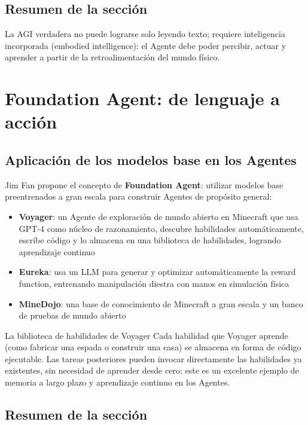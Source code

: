 \documentclass[a4paper]{article}
\begin{document}
\subsection{Resumen de la sección}

La AGI verdadera no puede lograrse solo leyendo texto; requiere inteligencia incorporada (embodied intelligence): el Agente debe poder percibir, actuar y aprender a partir de la retroalimentación del mundo físico.

\section{Foundation Agent: de lenguaje a acción}

\subsection{Aplicación de los modelos base en los Agentes}

Jim Fan propone el concepto de \textbf{Foundation Agent}: utilizar modelos base preentrenados a gran escala para construir Agentes de propósito general:

\begin{itemize}
    \item \textbf{Voyager}: un Agente de exploración de mundo abierto en Minecraft que usa GPT-4 como núcleo de razonamiento, descubre habilidades automáticamente, escribe código y lo almacena en una biblioteca de habilidades, logrando aprendizaje continuo
    \item \textbf{Eureka}: usa un LLM para generar y optimizar automáticamente la reward function, entrenando manipulación diestra con manos en simulación física
    \item \textbf{MineDojo}: una base de conocimiento de Minecraft a gran escala y un banco de pruebas de mundo abierto
\end{itemize}

\begin{knowledgebox}{La biblioteca de habilidades de Voyager}
Cada habilidad que Voyager aprende (como fabricar una espada o construir una casa) se almacena en forma de código ejecutable. Las tareas posteriores pueden invocar directamente las habilidades ya existentes, sin necesidad de aprender desde cero; este es un excelente ejemplo de memoria a largo plazo y aprendizaje continuo en los Agentes.
\end{knowledgebox}

\subsection{Resumen de la sección}
\end{document}
